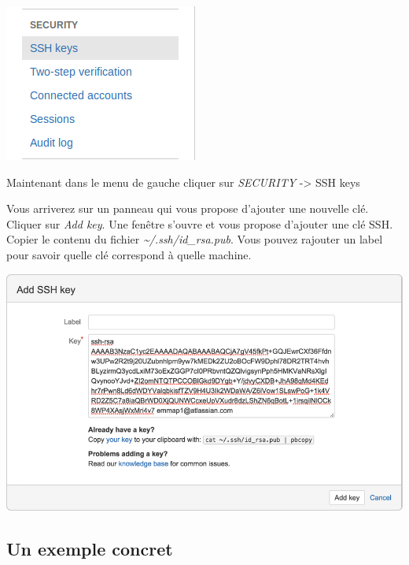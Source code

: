 \documentclass[12pt,a4paper]{article}
\begin{document}
\vspace{1cm}

\begin{minipage}{0.25\linewidth}
\includegraphics[width=\linewidth]{bitbucket2}
\end{minipage}\hfill
\begin{minipage}{0.75\linewidth}
Maintenant dans le menu de gauche cliquer sur \emph{SECURITY} -> SSH keys
\end{minipage}

Vous arriverez sur un panneau qui vous propose d'ajouter une nouvelle clé. Cliquer sur \emph{Add key}. Une fenêtre s'ouvre et vous propose d'ajouter une clé SSH. Copier le contenu du fichier \emph{\textasciitilde /.ssh/id\_rsa.pub}. Vous pouvez rajouter un label pour savoir quelle clé correspond à quelle machine.

\centerline{
\includegraphics[width=0.6\linewidth]{add_ssh_key}}

\subsection{Un exemple concret}
\end{document}
